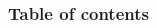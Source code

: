 




%
\frame{\titlepage}
%
\begin{frame}
\frametitle{Table of contents}
\begin{multicols}{2}
\tableofcontents
\end{multicols}
\end{frame}


%

%
%

%

